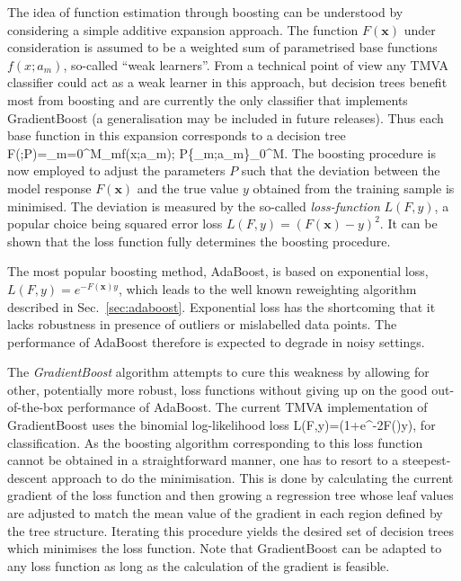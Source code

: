The idea of function estimation through boosting can be understood by
considering a simple additive expansion approach. The function
$F(\mathbf{x})$ under consideration is assumed to be a weighted sum of
parametrised base functions $f(x;a_m)$, so-called ``weak
learners''. From a technical point of view any TMVA classifier could
act as a weak learner in this approach, but decision trees benefit most
from boosting and are currently the only classifier that implements
GradientBoost (a generalisation may be included in future releases).
Thus each base function in this expansion corresponds to a
decision tree
\beq
   F(;P)=\sum_{m=0}^{M}\beta_mf(x;a_m); \hspace{0.5cm} 
   P\in \{\beta_m;a_m\}_0^M\:.
\eeq
The boosting procedure is now employed to adjust the parameters $P$
such that the deviation between the model response $F(\mathbf{x})$ and
the true value $y$ obtained from the training sample is minimised. The
deviation is measured by the so-called \textit{loss-function}
$L(F,y)$, a popular choice being squared error loss
$L(F,y)=(F(\mathbf{x})-y)^2$. It can be shown that the loss
function fully determines the boosting procedure.

The most popular boosting method, AdaBoost, is based on exponential
loss, $L(F,y)=e^{-F(\mathbf{x})y}$, which leads to the well known
reweighting algorithm described in
Sec.~\ref{sec:adaboost}. Exponential loss has the shortcoming that it
lacks robustness in presence of outliers or mislabelled data
points. The performance of AdaBoost therefore is expected to degrade
in noisy settings.

The \textit{GradientBoost} algorithm attempts to cure this weakness by allowing 
for other, potentially more robust, loss functions without giving up on the 
good out-of-the-box performance of AdaBoost. The current TMVA implementation 
of GradientBoost uses the binomial log-likelihood loss
\beq
   L(F,y)=\ln\left(1+e^{-2F()y}\right)\:,
\eeq
for classification. As the boosting algorithm corresponding to this
loss function cannot be obtained in a straightforward manner, one has
to resort to a steepest-descent approach to do the minimisation. This
is done by calculating the current gradient of the loss function and
then growing a regression tree whose leaf values are adjusted to match
the mean value of the gradient in each region defined by the tree
structure. Iterating this procedure yields the desired set of
decision trees which minimises the loss function. Note that
GradientBoost can be adapted to any loss
function as long as the calculation of the gradient is feasible.

